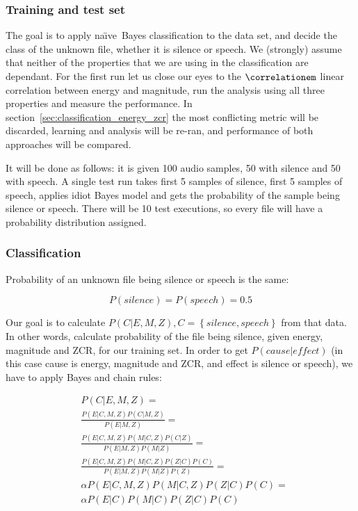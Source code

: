 \documentclass[english,11pt]{article}
\numberwithin{equation}{section}
\newcommand{\naive}{na\"{\i}ve\ }
\begin{document}
\subsubsection{Training and test set}
The goal is to apply \naive Bayes classification to the data set, and decide
the class of the unknown file, whether it is silence or speech. We (strongly)
assume that neither of the properties that we are using in the classification
are dependant. For the first run let us close our eyes to the $\correlationem$
linear correlation between energy and magnitude, run the analysis using all
three properties and measure the performance. In
section~\ref{sec:classification_energy_zcr} the most conflicting metric will be
discarded, learning and analysis will be re-ran, and performance of both
approaches will be compared.

It will be done as follows: it is given 100 audio samples, 50 with silence and
50 with speech. A single test run takes first 5 samples of silence, first 5
samples of speech, applies idiot Bayes model\cite{idiotbayes} and gets the
probability of the sample being silence or speech. There will be 10 test
executions, so every file will have a probability distribution assigned.

\subsubsection{Classification}
Probability of an unknown file being silence or speech is the same:

$$ P(silence) = P(speech) = 0.5 $$

Our goal is to calculate $ P(C | E, M, Z), C = \left\{ silence, speech
\right\}$ from that data. In other words, calculate probability of the file
being silence, given energy, magnitude and ZCR, for our training set. In order
to get $P(cause|effect)$ (in this case cause is energy, magnitude and ZCR, and
effect is silence or speech), we have to apply Bayes and chain rules:

\begin{align}
   & P(C | E, M, Z) = \\
   & \frac{ P(E|C,M,Z) P(C|M,Z) }{ P(E|M,Z) } = \\
   & \frac{ P(E|C,M,Z) P(M|C,Z) P(C|Z) }{ P(E|M,Z) P(M|Z) } = \\
   & \frac{ P(E|C,M,Z) P(M|C,Z) P(Z|C) P(C) }{ P(E|M,Z) P(M|Z) P(Z) } =
    \label{eq:chain_rule} \\
   & \alpha P(E|C,M,Z) P(M|C,Z) P(Z|C) P(C) = \label{eq:alpha} \\
   & \alpha P(E|C) P(M|C) P(Z|C) P(C) \label{eq:independence}
\end{align}
\end{document}
